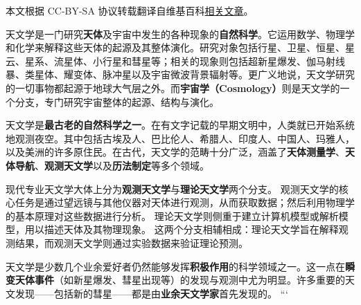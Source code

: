 
本文根据 CC-BY-SA 协议转载翻译自维基百科\href{https://en.wikipedia.org/wiki/Astronomy?utm_source=chatgpt.com}{相关文章}。



天文学是一门研究\textbf{天体}及宇宙中发生的各种现象的\textbf{自然科学}。它运用数学、物理学和化学来解释这些天体的起源及其整体演化。研究对象包括行星、卫星、恒星、星云、星系、流星体、小行星和彗星等；相关的现象则包括超新星爆发、伽马射线暴、类星体、耀变体、脉冲星以及宇宙微波背景辐射等。更广义地说，天文学研究的一切事物都起源于地球大气层之外。而\textbf{宇宙学（Cosmology）}则是天文学的一个分支，专门研究宇宙整体的起源、结构与演化。

天文学是\textbf{最古老的自然科学之一}。在有文字记载的早期文明中，人类就已开始系统地观测夜空。其中包括古埃及人、巴比伦人、希腊人、印度人、中国人、玛雅人，以及美洲的许多原住民。在古代，天文学的范畴十分广泛，涵盖了\textbf{天体测量学}、\textbf{天体导航}、\textbf{观测天文学}以及\textbf{历法制定}等多个领域。

现代专业天文学大体上分为\textbf{观测天文学}与\textbf{理论天文学}两个分支。  
观测天文学的核心任务是通过望远镜与其他仪器对天体进行观测，从而获取数据；然后利用物理学的基本原理对这些数据进行分析。  
理论天文学则侧重于建立计算机模型或解析模型，用以描述天体及其物理现象。  
这两个分支相辅相成：理论天文学旨在解释观测结果，而观测天文学则通过实验数据来验证理论预测。

天文学是少数几个业余爱好者仍然能够发挥\textbf{积极作用}的科学领域之一。这一点在\textbf{瞬变天体事件}（如新星爆发、彗星出现等）的发现与观测中尤为明显。许多重要的天文发现——包括新的彗星——都是由\textbf{业余天文学家}首先发现的。
```

